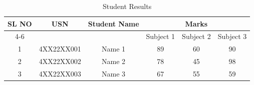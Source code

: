 \documentclass{article}
\begin{document}
\begin{table}[h]
\centering
\caption{Student Results}
\label{tab:results}

\begin{tabular}{|c|c|c|c|c|c|}
\hline
\multirow{2}{*}{SL NO} & \multirow{2}{*}{USN} & 
\multirow{2}{*}{Student Name} & \multicolumn{3}{c|}{Marks} \\

\cline{4-6} & & & Subject 1 & Subject 2 & Subject 3 \\

\hline
1 & 4XX22XX001 & Name 1 & 89 & 60 & 90 \\

\hline
2 & 4XX22XX002 & Name 2 & 78 & 45 & 98 \\

\hline
3 & 4XX22XX003 & Name 3 & 67 & 55 & 59 \\

\hline
\end{tabular}

\end{table}
\end{document}
